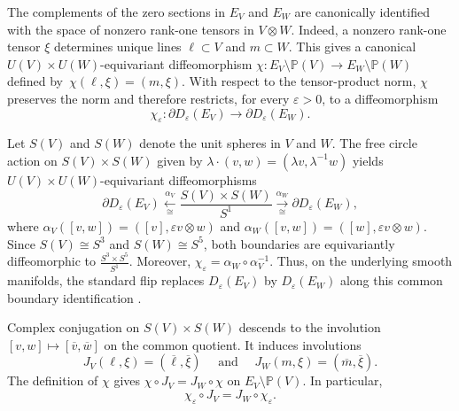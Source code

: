 \documentclass{amsart}
\numberwithin{equation}{section}
\theoremstyle{definition}
\renewcommand{\P}{\mathbb P}
\newcommand{\wideand}{ \quad \text{ and } \quad }
\begin{document}
The complements of the zero sections in $E_V$ and $E_W$ are canonically identified with the space of nonzero rank-one tensors in $V\otimes W$. 
Indeed, a nonzero rank-one tensor $\xi$ determines unique lines $\ell\subset V$ and $m\subset W$. 
This gives a canonical $U(V)\times U(W)$-equivariant diffeomorphism $\chi\colon E_V\setminus\P(V)\to E_W\setminus\P(W)$ defined by~$\chi(\ell,\xi)=(m,\xi)$.
With respect to the tensor-product norm, $\chi$ preserves the norm and therefore restricts, for every $\varepsilon>0$, to a diffeomorphism
$$
    \chi_\varepsilon\colon \partial D_\varepsilon(E_V)\longrightarrow \partial D_\varepsilon(E_W).
$$

Let $S(V)$ and $S(W)$ denote the unit spheres in $V$ and $W$. 
The free circle action on $S(V)\times S(W)$ given by $\lambda\cdot(v,w)=(\lambda v,\lambda^{-1}w)$ yields $U(V)\times U(W)$-equivariant diffeomorphisms
$$
    \partial D_\varepsilon(E_V) \xleftarrow[\cong]{\alpha_V} \frac{S(V)\times S(W)}{S^1} \xrightarrow[\cong]{\alpha_W}\partial D_\varepsilon(E_W),
$$
where $\alpha_V([v,w])=([v],\varepsilon v\otimes w)$ and $\alpha_W([v,w])=([w],\varepsilon v\otimes w)$.
Since $S(V)\cong S^3$ and $S(W)\cong S^5$, both boundaries are equivariantly diffeomorphic to $\frac{S^3\times S^5}{S^1}$. 
Moreover, $\chi_\varepsilon=\alpha_W\circ\alpha_V^{-1}$.
Thus, on the underlying smooth manifolds, the standard flip replaces $D_\varepsilon(E_V)$ by $D_\varepsilon(E_W)$ along this common boundary identification \cite[Section~3.1]{Fu-Hoskins-PLehalleur2023}.

Complex conjugation on $S(V)\times S(W)$ descends to the involution $[v,w]\mapsto[\overline v,\overline w]$ on the common quotient. 
It induces involutions
$$
    J_V(\ell,\xi)=(\overline{\ell},\overline{\xi}) \wideand J_W(m,\xi)=(\overline{m},\overline{\xi}).
$$
The definition of $\chi$ gives $\chi\circ J_V=J_W\circ\chi$ on $E_V\setminus\P(V)$. 
In particular,
\begin{equation}\label{eq:conjugation}
    \chi_\varepsilon\circ J_V=J_W\circ\chi_\varepsilon.
\end{equation}
\end{document}
